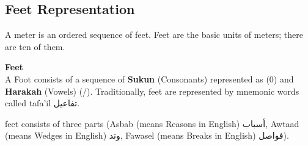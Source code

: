     \newpage
    
    \subsection{Feet Representation}
    A meter is an ordered sequence of feet. Feet are the basic
units of meters; there are ten of them.
\begin{definition}\label{def:feet}
  \textbf{Feet} \hfill \\  A Foot consists of
a sequence of \textbf{Sukun} (Consonants) represented as (0) and \textbf{Harakah} (Vowels) (/). Traditionally, feet are represented by mnemonic words called tafa’il \textarabic{تفاعيل}.
\end{definition}

feet consists of three parts (Asbab (means Reasons in English) \textarabic{أسباب}, Awtaad (means Wedges in English) \textarabic{وتد}, Fawasel (means Breaks in English) \textarabic{فواصل}).
